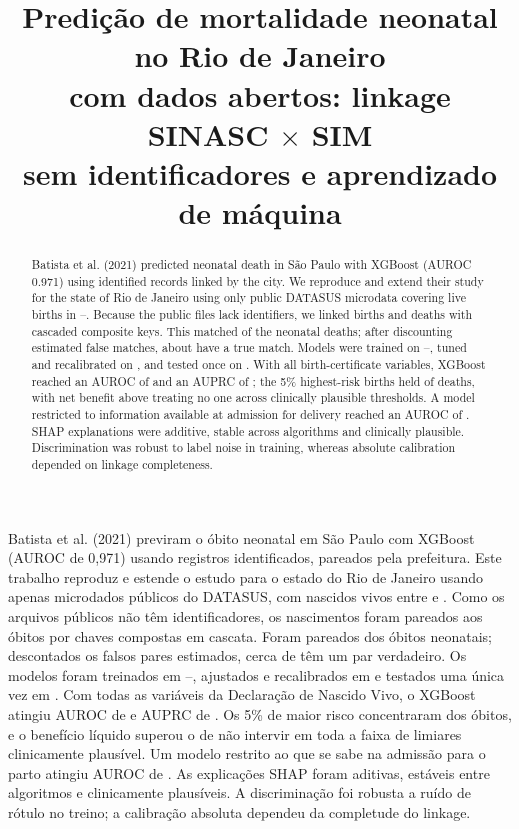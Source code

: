 \documentclass[12pt]{article}
\title{Predição de mortalidade neonatal no Rio de Janeiro\\
com dados abertos: linkage SINASC $\times$ SIM\\
sem identificadores e aprendizado de máquina}
\author{\nomeautor\inst{1}}
\begin{document}
\maketitle

\begin{abstract}
Batista et al. (2021) predicted neonatal death in São Paulo with XGBoost (AUROC 0.971) using identified records linked by the city. We reproduce and extend their study for the state of Rio de Janeiro using only public DATASUS microdata covering \nNVEn{} live births in \anoIni--\anoFim. Because the public files lack identifiers, we linked births and deaths with cascaded composite keys. This matched \pctPareadoEn{} of the \nObitosSIMEn{} neonatal deaths; after discounting estimated false matches, about \pctVerdadeirosEn{} have a true match. Models were trained on \anoIni--\anoAjFim, tuned and recalibrated on \anoValid{}, and tested once on \anoTeste{}. With all birth-certificate variables, XGBoost reached an AUROC of \AXgbAurocICEn{} and an AUPRC of \AXgbAuprcEn{}; the 5\% highest-risk births held \AXgbTopEn{} of deaths, with net benefit above treating no one across clinically plausible thresholds. A model restricted to information available at admission for delivery reached an AUROC of \BXgbAurocEn{}. SHAP explanations were additive, stable across algorithms and clinically plausible. Discrimination was robust to label noise in training, whereas absolute calibration depended on linkage completeness.
\end{abstract}

\begin{resumo}
Batista et al. (2021) previram o óbito neonatal em São Paulo com XGBoost (AUROC de 0,971) usando registros identificados, pareados pela prefeitura. Este trabalho reproduz e estende o estudo para o estado do Rio de Janeiro usando apenas microdados públicos do DATASUS, com \nNV{} nascidos vivos entre \anoIni{} e \anoFim. Como os arquivos públicos não têm identificadores, os nascimentos foram pareados aos óbitos por chaves compostas em cascata. Foram pareados \pctPareado{} dos \nObitosSIM{} óbitos neonatais; descontados os falsos pares estimados, cerca de \pctVerdadeiros{} têm um par verdadeiro. Os modelos foram treinados em \anoIni--\anoAjFim, ajustados e recalibrados em \anoValid{} e testados uma única vez em \anoTeste{}. Com todas as variáveis da Declaração de Nascido Vivo, o XGBoost atingiu AUROC de \AXgbAurocIC{} e AUPRC de \AXgbAuprc{}. Os 5\% de maior risco concentraram \AXgbTop{} dos óbitos, e o benefício líquido superou o de não intervir em toda a faixa de limiares clinicamente plausível. Um modelo restrito ao que se sabe na admissão para o parto atingiu AUROC de \BXgbAuroc{}. As explicações SHAP foram aditivas, estáveis entre algoritmos e clinicamente plausíveis. A discriminação foi robusta a ruído de rótulo no treino; a calibração absoluta dependeu da completude do linkage.
\end{resumo}
\end{document}
